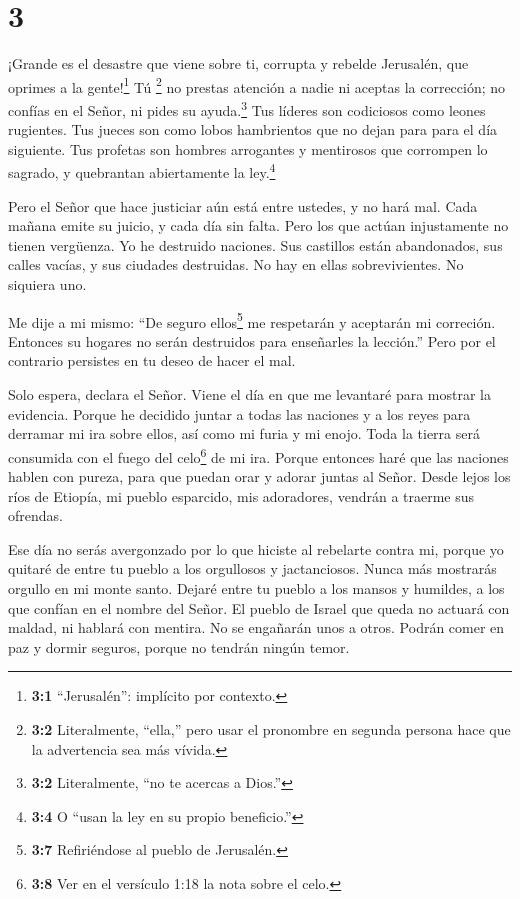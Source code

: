 \hypertarget{section-2}{%
\section{3}\label{section-2}}

 ¡Grande es el desastre que viene sobre ti, corrupta y
rebelde Jerusalén, que oprimes a la gente!\footnote{\textbf{3:1}
  ``Jerusalén'': implícito por contexto.}  Tú \footnote{\textbf{3:2}
  Literalmente, ``ella,'' pero usar el pronombre en segunda persona hace
  que la advertencia sea más vívida.} no prestas atención a nadie ni
aceptas la corrección; no confías en el Señor, ni pides su
ayuda.\footnote{\textbf{3:2} Literalmente, ``no te acercas a Dios.''}
 Tus líderes son codiciosos como leones rugientes. Tus
jueces son como lobos hambrientos que no dejan para para el día
siguiente.  Tus profetas son hombres arrogantes y mentirosos
que corrompen lo sagrado, y quebrantan abiertamente la ley.\footnote{\textbf{3:4}
  O ``usan la ley en su propio beneficio.''}

 Pero el Señor que hace justiciar aún está entre ustedes, y
no hará mal. Cada mañana emite su juicio, y cada día sin falta. Pero los
que actúan injustamente no tienen vergüenza.  Yo he
destruido naciones. Sus castillos están abandonados, sus calles vacías,
y sus ciudades destruidas. No hay en ellas sobrevivientes. No siquiera
uno.

 Me dije a mi mismo: ``De seguro ellos\footnote{\textbf{3:7}
  Refiriéndose al pueblo de Jerusalén.} me respetarán y aceptarán mi
correción. Entonces su hogares no serán destruidos para enseñarles la
lección.'' Pero por el contrario persistes en tu deseo de hacer el mal.

 Solo espera, declara el Señor. Viene el día en que me
levantaré para mostrar la evidencia. Porque he decidido juntar a todas
las naciones y a los reyes para derramar mi ira sobre ellos, así como mi
furia y mi enojo. Toda la tierra será consumida con el fuego del
celo\footnote{\textbf{3:8} Ver en el versículo 1:18 la nota sobre el
  celo.} de mi ira.  Porque entonces haré que las naciones
hablen con pureza, para que puedan orar y adorar juntas al Señor.
 Desde lejos los ríos de Etiopía, mi pueblo esparcido, mis
adoradores, vendrán a traerme sus ofrendas.

 Ese día no serás avergonzado por lo que hiciste al
rebelarte contra mi, porque yo quitaré de entre tu pueblo a los
orgullosos y jactanciosos. Nunca más mostrarás orgullo en mi monte
santo.  Dejaré entre tu pueblo a los mansos y humildes, a
los que confían en el nombre del Señor.  El pueblo de
Israel que queda no actuará con maldad, ni hablará con mentira. No se
engañarán unos a otros. Podrán comer en paz y dormir seguros, porque no
tendrán ningún temor.

